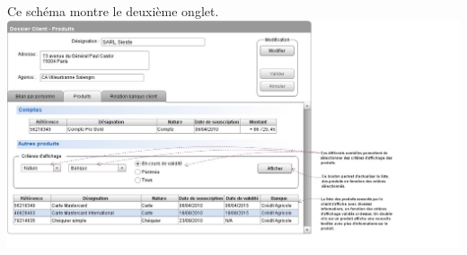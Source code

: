 		\paragraph*{}
		Ce schéma montre le deuxième onglet. \\
		\includegraphics[width=\linewidth]{IHM/IHMclient2.jpg}
		
